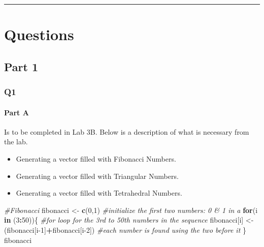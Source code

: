 \documentclass[
]{article}
\newenvironment{Shaded}{\begin{snugshade}}{\end{snugshade}}
\newcommand{\CommentTok}[1]{\textcolor[rgb]{0.56,0.35,0.01}{\textit{#1}}}
\newcommand{\ControlFlowTok}[1]{\textcolor[rgb]{0.13,0.29,0.53}{\textbf{#1}}}
\newcommand{\DecValTok}[1]{\textcolor[rgb]{0.00,0.00,0.81}{#1}}
\newcommand{\KeywordTok}[1]{\textcolor[rgb]{0.13,0.29,0.53}{\textbf{#1}}}
\newcommand{\NormalTok}[1]{#1}
\newcommand{\OperatorTok}[1]{\textcolor[rgb]{0.81,0.36,0.00}{\textbf{#1}}}
\newcommand{\StringTok}[1]{\textcolor[rgb]{0.31,0.60,0.02}{#1}}
\begin{document}
\begin{center}\rule{0.5\linewidth}{0.5pt}\end{center}

\hypertarget{questions}{%
\section{Questions}\label{questions}}

\hypertarget{part-1}{%
\subsection{Part 1}\label{part-1}}

\hypertarget{q1}{%
\subsubsection{Q1}\label{q1}}

\hypertarget{part-a}{%
\paragraph{Part A}\label{part-a}}

Is to be completed in Lab 3B. Below is a description of what is
necessary from the lab.

\begin{itemize}
\item
  Generating a vector filled with Fibonacci Numbers.
\item
  Generating a vector filled with Triangular Numbers.
\item
  Generating a vector filled with Tetrahedral Numbers.
\end{itemize}

\begin{Shaded}
\begin{Highlighting}[]
\CommentTok{#Fibonacci}
\NormalTok{fibonacci <-}\StringTok{ }\KeywordTok{c}\NormalTok{(}\DecValTok{0}\NormalTok{,}\DecValTok{1}\NormalTok{)               }\CommentTok{#initialize the first two numbers: 0 & 1 in a }
\ControlFlowTok{for}\NormalTok{(i }\ControlFlowTok{in}\NormalTok{ (}\DecValTok{3}\OperatorTok{:}\DecValTok{50}\NormalTok{))\{                 }\CommentTok{#for loop for the 3rd to 50th numbers in the sequence}
\NormalTok{  fibonacci[i] <-}\StringTok{ }\NormalTok{(fibonacci[i}\DecValTok{-1}\NormalTok{]}\OperatorTok{+}\NormalTok{fibonacci[i}\DecValTok{-2}\NormalTok{]) }\CommentTok{#each number is found using the two before it}
\NormalTok{\}}
\NormalTok{fibonacci }
\end{Highlighting}
\end{Shaded}
\end{document}
